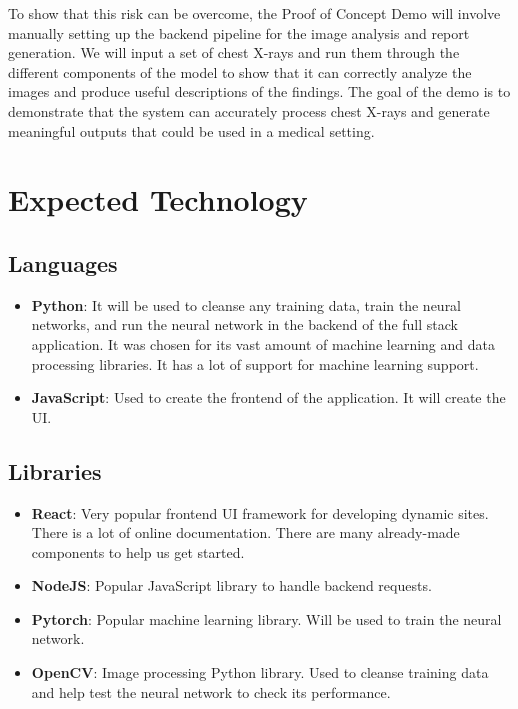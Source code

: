 \documentclass{article}
\begin{document}
To show that this risk can be overcome, the Proof of Concept Demo will involve
manually setting up the backend pipeline for the image analysis and report generation.
We will input a set of chest X-rays and run them through the different components of
the model to show that it can correctly analyze the images and produce useful
descriptions of the findings. The goal of the demo is to demonstrate that the system
can accurately process chest X-rays and generate meaningful outputs that could be
used in a medical setting.

\section{Expected Technology}

\subsection{Languages}
\begin{itemize}
  \item \textbf{Python}: It will be used to cleanse any training data, train the neural networks,
    and run the neural network in the backend of the full stack application. It was chosen for its
    vast amount of machine learning and data processing libraries. It has a lot of support for
    machine learning support.
  \item \textbf{JavaScript}: Used to create the frontend of the application. It will create the UI.
\end{itemize}

\subsection{Libraries}
\begin{itemize}
  \item \textbf{React}: Very popular frontend UI framework for developing dynamic sites. There is
    a lot of online documentation. There are many already-made components to help us get started.
  \item \textbf{NodeJS}: Popular JavaScript library to handle backend requests.
  \item \textbf{Pytorch}: Popular machine learning library. Will be used to train the neural
    network.
  \item \textbf{OpenCV}: Image processing Python library. Used to cleanse training data and help
    test the neural network to check its performance.
\end{itemize}
\end{document}
